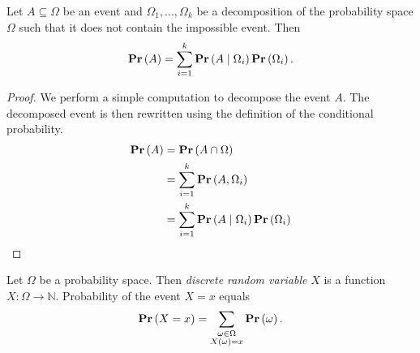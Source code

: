 \begin{theorem}
\label{theorem-law-of-total-probability}
Let $A \subseteq \Omega$ be an event and $\Omega_1, \dots, \Omega_k$ be a decomposition of the probability space $\Omega$ such that it does not contain the impossible event. Then
\[
\mathbf{Pr}\left(A\right) = \displaystyle\sum_{i = 1}^{k} \mathbf{Pr}\left(A \mid \Omega_i\right) \mathbf{Pr}\left(\Omega_i\right) \text{.}
\]
\end{theorem}
\begin{proof}
We perform a simple computation to decompose the event $A$. The decomposed event is then rewritten using the definition of the conditional probability.
\[
\begin{split}
\mathbf{Pr}\left(A\right)
	& = \mathbf{Pr}\left(A \cap \Omega\right) \\
	& = \displaystyle\sum_{i = 1}^{k} \mathbf{Pr}\left(A, \Omega_i\right) \\
	& = \displaystyle\sum_{i = 1}^{k} \mathbf{Pr}\left(A \mid \Omega_i\right) \mathbf{Pr}\left(\Omega_i\right) \\
\end{split}
\]
\end{proof}

\begin{definition}
Let $\Omega$ be a probability space. Then \emph{discrete random variable} $X$ is a function $X: \Omega \rightarrow \mathbb{N}$. Probability of the event $X = x$ equals
\[
\mathbf{Pr}\left(X = x\right) = \displaystyle\sum_{\substack{\omega \in \Omega \\ X(\omega) = x}} \mathbf{Pr}\left(\omega\right) \text{.}
\]
\end{definition}

